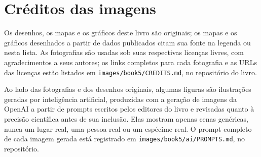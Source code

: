 \chapter*{Créditos das imagens}

Os desenhos, os mapas e os gráficos deste livro são originais; os mapas e os
gráficos desenhados a partir de dados publicados citam sua fonte na legenda ou
nesta lista. As fotografias são usadas sob suas respectivas licenças livres, com
agradecimentos a seus autores; os links completos para cada fotografia e as URLs
das licenças estão listados em \texttt{images/book5/CREDITS.md}, no repositório
do livro.

\bigskip
Ao lado das fotografias e dos desenhos originais, algumas figuras são ilustrações
geradas por inteligência artificial, produzidas com a geração de imagens da OpenAI
a partir de prompts escritos pelos editores do livro e revisadas quanto à precisão
científica antes de sua inclusão. Elas mostram apenas cenas genéricas, nunca um
lugar real, uma pessoa real ou um espécime real. O prompt completo de cada imagem
gerada está registrado em \texttt{images/book5/ai/PROMPTS.md}, no repositório.

